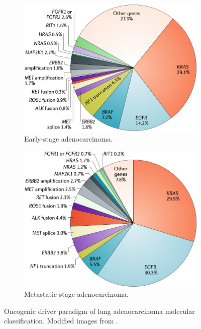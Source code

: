 \begin{figure}[ht]
    \centering
    \begin{subfigure}{0.49\textwidth}
        \centering
        \includegraphics[width=\textwidth]{Images/chapter_1/drivers_early.png}
        \caption{Early-stage adenocarcinoma.}
        \label{fig:Drivers_early}
    \end{subfigure}
    \hfill
    \begin{subfigure}{0.49\textwidth}
        \centering
        \includegraphics[width=\textwidth]{Images/chapter_1/drivers_metastasis.png}
        \caption{Metastatic-stage adenocarcinoma.}
        \label{fig:Drivers_metastasis}
    \end{subfigure}
    \caption{Oncogenic driver paradigm of lung adenocarcinoma molecular classification. Modified images from \cite{NSCLC_alterations}.}
    \label{fig:Drivers}
\end{figure}

